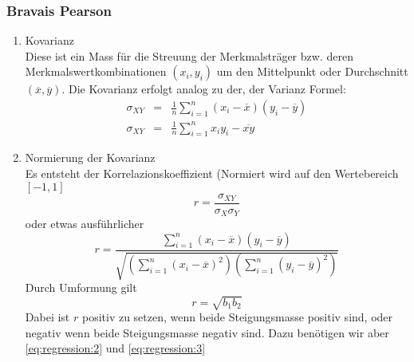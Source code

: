 \subsubsection{Bravais Pearson}
\begin{enumerate}[label=\bfseries \arabic*. Schritt: ]
\item Kovarianz\\
Diese ist ein Mass für die Streuung der Merkmalsträger bzw. deren Merkmalswertkombinationen $(x_i, y_i)$ um den Mittelpunkt oder Durchschnitt $(\overline{x}, \overline{y})$. Die Kovarianz erfolgt analog zu der, der Varianz
Formel:
\begin{align}
\sigma_{XY}&=&\frac{1}{n}\sum_{i=1}^n (x_i-\overline{x})(y_i-\overline{y})\label{eq:regression:2}\\
\sigma_{XY}&=&\frac{1}{n}\sum_{i=1}^n x_i y_i - \overline{xy}\label{eq:regression:3}
\end{align}
\item Normierung der Kovarianz\\
Es entsteht der Korrelazionskoeffizient (Normiert wird auf den Wertebereich $[-1,1]$
\begin{equation}
r=\frac{\sigma_{XY}}{\sigma_X\sigma_Y}
\end{equation}
oder etwas ausführlicher
\begin{equation}
r=\frac{\sum_{i=1}^n(x_i-\overline{x})(y_i-\overline{y})}{\sqrt{(\sum_{i=1}^n(x_i-\overline{x})^2)(\sum_{i=1}^n (y_i-\overline{y})^2)}}
\end{equation}
Durch Umformung gilt
\begin{equation}
r=\sqrt{b_1 b_2}
\end{equation}
Dabei ist $r$ positiv zu setzen, wenn beide Steigungsmasse positiv sind, oder negativ wenn beide Steigungsmasse negativ sind. Dazu benötigen wir aber \autoref{eq:regression:2} und \autoref{eq:regression:3}
\end{enumerate}
